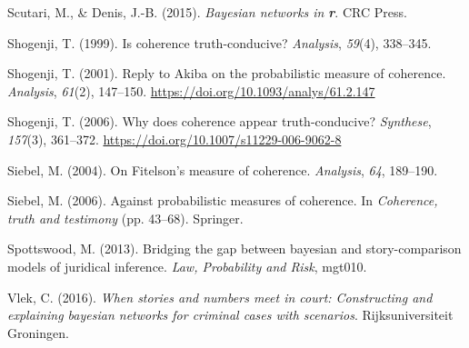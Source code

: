 \documentclass[
  10pt,
]{scrartcl}
\newlength{\cslhangindent}
\newlength{\cslentryspacingunit} %
\newenvironment{CSLReferences}[2] %
 {%
  \setlength{\parindent}{0pt}
  \ifodd #1
  \let\oldpar\par
  \def\par{\hangindent=\cslhangindent\oldpar}
  \fi
  \setlength{\parskip}{#2\cslentryspacingunit}
 }%
 {}
\begin{document}
\begin{CSLReferences}{1}{0}
\leavevmode{}%
Scutari, M., \& Denis, J.-B. (2015). \emph{Bayesian networks in \textbf{{r}}}. CRC Press.

\leavevmode{}%
Shogenji, T. (1999). Is coherence truth-conducive? \emph{Analysis}, \emph{59}(4), 338--345.

\leavevmode{}%
Shogenji, T. (2001). Reply to {A}kiba on the probabilistic measure of coherence. \emph{Analysis}, \emph{61}(2), 147--150. \url{https://doi.org/10.1093/analys/61.2.147}

\leavevmode{}%
Shogenji, T. (2006). Why does coherence appear truth-conducive? \emph{Synthese}, \emph{157}(3), 361--372. \url{https://doi.org/10.1007/s11229-006-9062-8}

\leavevmode{}%
Siebel, M. (2004). On {F}itelson's measure of coherence. \emph{Analysis}, \emph{64}, 189--190.

\leavevmode{}%
Siebel, M. (2006). Against probabilistic measures of coherence. In \emph{Coherence, truth and testimony} (pp. 43--68). Springer.

\leavevmode{}%
Spottswood, M. (2013). Bridging the gap between bayesian and story-comparison models of juridical inference. \emph{Law, Probability and Risk}, mgt010.

\leavevmode{}%
Vlek, C. (2016). \emph{When stories and numbers meet in court: Constructing and explaining bayesian networks for criminal cases with scenarios}. Rijksuniversiteit Groningen.

\end{CSLReferences}
\end{document}

